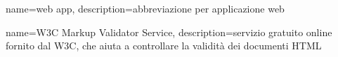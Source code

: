 

{
	name=web app,
	description={abbreviazione per applicazione web}
}

{
	name=W3C Markup Validator Service,
	description={servizio gratuito online fornito dal W3C, che aiuta a controllare la validità dei documenti HTML}
}